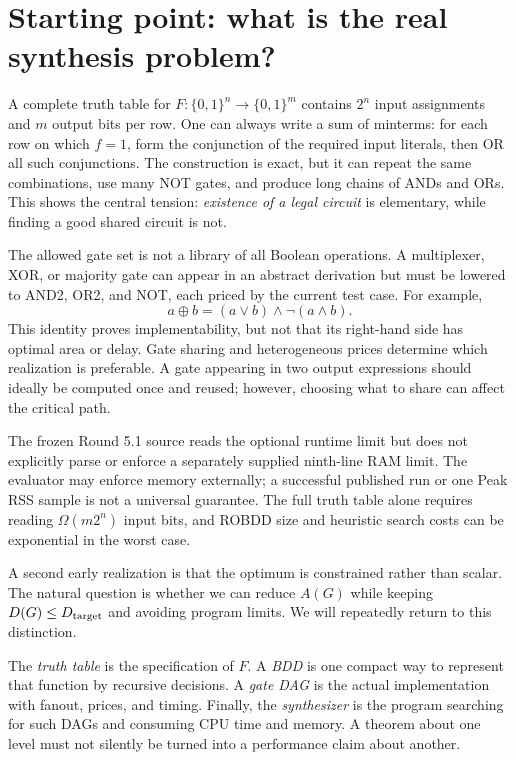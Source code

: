 \section{Starting point: what is the real synthesis problem?}
A complete truth table for $F:\{0,1\}^n\to\{0,1\}^m$ contains $2^n$ input assignments and $m$ output bits per row. One can always write a sum of minterms: for each row on which $f=1$, form the conjunction of the required input literals, then OR all such conjunctions. The construction is exact, but it can repeat the same combinations, use many NOT gates, and produce long chains of ANDs and ORs. This shows the central tension: \emph{existence of a legal circuit} is elementary, while finding a good shared circuit is not.

The allowed gate set is not a library of all Boolean operations. A multiplexer, XOR, or majority gate can appear in an abstract derivation but must be lowered to AND2, OR2, and NOT, each priced by the current test case. For example,
\begin{equation}
 a\oplus b=(a\lor b)\land\neg(a\land b).
\end{equation}
This identity proves implementability, but not that its right-hand side has optimal area or delay. Gate sharing and heterogeneous prices determine which realization is preferable. A gate appearing in two output expressions should ideally be computed once and reused; however, choosing what to share can affect the critical path.

The frozen Round 5.1 source reads the optional runtime limit but does not explicitly parse or enforce a separately supplied ninth-line RAM limit. The evaluator may enforce memory externally; a successful published run or one Peak RSS sample is not a universal guarantee. The full truth table alone requires reading $\Omega(m2^n)$ input bits, and ROBDD size and heuristic search costs can be exponential in the worst case.

A second early realization is that the optimum is constrained rather than scalar. The natural question is whether we can reduce $A(G)$ while keeping $D(G)\le D_{\rm target}$ and avoiding program limits. We will repeatedly return to this distinction.

\begin{tcolorbox}[colback=ResearchIvory!75,colframe=ResearchSlate,title=Four levels of objects: keep them separate]
The \emph{truth table} is the specification of $F$. A \emph{BDD} is one compact way to represent that function by recursive decisions. A \emph{gate DAG} is the actual implementation with fanout, prices, and timing. Finally, the \emph{synthesizer} is the program searching for such DAGs and consuming CPU time and memory. A theorem about one level must not silently be turned into a performance claim about another.
\end{tcolorbox}

